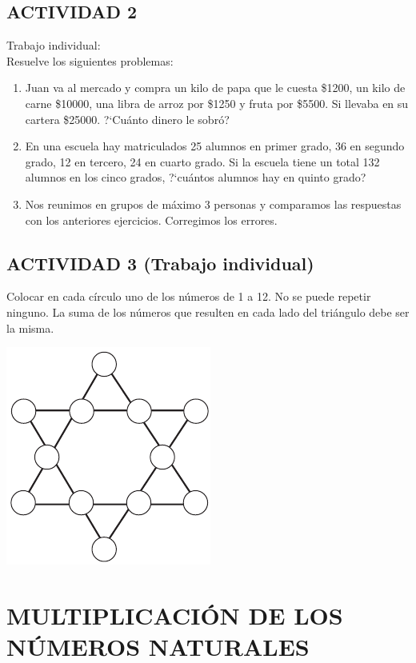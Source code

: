 \documentclass[10pt,twoside]{article}
\begin{document}
\subsection*{ACTIVIDAD 2}
Trabajo individual:\\
Resuelve los siguientes problemas:
\begin{enumerate}
 \item Juan va al mercado y compra un kilo de papa que le cuesta \$1200, un kilo de carne \$10000, una libra de arroz por \$1250 y fruta por \$5500. Si llevaba en su cartera \$25000. ?`Cu\'anto dinero le sobr\'o?
\item En una escuela hay matriculados 25 alumnos en primer grado, 36 en segundo grado, 12 en tercero, 24 en cuarto grado. Si la escuela tiene un total 132 alumnos en los cinco grados, ?`cu\'antos alumnos hay en quinto grado?
\item Nos reunimos en grupos de m\'aximo 3 personas y comparamos las respuestas con los anteriores ejercicios. Corregimos los errores.
\end{enumerate}
\subsection*{ACTIVIDAD 3 (Trabajo individual)}
Colocar en cada c\'irculo uno de los n\'umeros de 1 a 12. No se puede repetir ninguno. La suma de los n\'umeros que resulten en cada lado del tri\'angulo debe ser la misma.
\begin{center}
 \includegraphics{Images/estrella.png}
\end{center}
\section*{MULTIPLICACI\'ON DE LOS N\'UMEROS NATURALES}
\end{document}
